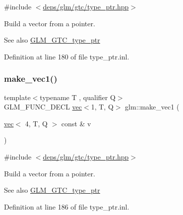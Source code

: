 {\ttfamily \#include $<$\hyperlink{type__ptr_8hpp}{deps/glm/gtc/type\+\_\+ptr.\+hpp}$>$}

Build a vector from a pointer. \begin{DoxySeeAlso}{See also}
\hyperlink{group__gtc__type__ptr}{G\+L\+M\+\_\+\+G\+T\+C\+\_\+type\+\_\+ptr} 
\end{DoxySeeAlso}


Definition at line 180 of file type\+\_\+ptr.\+inl.

\mbox{\label{group__gtc__type__ptr_ga6af06bb60d64ca8bcd169e3c93bc2419}} 
\subsubsection{\texorpdfstring{make\+\_\+vec1()}{make\_vec1()}\hspace{0.1cm}{\footnotesize\ttfamily [4/4]}}
{\footnotesize\ttfamily template$<$typename T , qualifier Q$>$ \\
G\+L\+M\+\_\+\+F\+U\+N\+C\+\_\+\+D\+E\+CL \hyperlink{structglm_1_1vec}{vec}$<$1, T, Q$>$ glm\+::make\+\_\+vec1 (\begin{DoxyParamCaption}\item[{\hyperlink{structglm_1_1vec}{vec}$<$ 4, T, Q $>$ const \&}]{v }\end{DoxyParamCaption})\hspace{0.3cm}{\ttfamily [inline]}}



{\ttfamily \#include $<$\hyperlink{type__ptr_8hpp}{deps/glm/gtc/type\+\_\+ptr.\+hpp}$>$}

Build a vector from a pointer. \begin{DoxySeeAlso}{See also}
\hyperlink{group__gtc__type__ptr}{G\+L\+M\+\_\+\+G\+T\+C\+\_\+type\+\_\+ptr} 
\end{DoxySeeAlso}


Definition at line 186 of file type\+\_\+ptr.\+inl.

\mbox{\label{group__gtc__type__ptr_ga8476d0e6f1b9b4a6193cc25f59d8a896}} 
